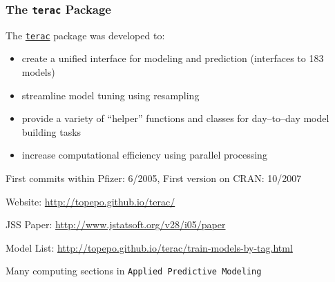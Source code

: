 \documentclass[12 pt]{beamer}\usepackage[]{graphicx}\usepackage[]{color}
\newcommand{\pkg}[1]{{\fontseries{b}\selectfont #1}}
\renewcommand{\pkg}[1]{{\color{darkgreen}\texttt{#1}}}
\begin{document}
  \begin{frame}[fragile]
\frametitle{The \pkg{terac} Package}

The \href{http://cran.r-project.org/web/packages/terac/index.html}{\pkg{terac}}  package was developed to:
  \begin{itemize}
\item create a unified interface for modeling and prediction
(interfaces to 183 models)
\item streamline model tuning using resampling
\item provide a variety of ``helper'' functions and classes for day--to--day model building tasks
\item increase computational efficiency using parallel processing
\end{itemize}

\vspace{.08in}

First commits within Pfizer: 6/2005, First version on CRAN: 10/2007

\vspace{.06in}

Website: \href{http://topepo.github.io/terac/}{http://topepo.github.io/terac/}

\vspace{.06in}

JSS Paper: \href{http://www.jstatsoft.org/v28/i05/paper}{http://www.jstatsoft.org/v28/i05/paper}

\vspace{.06in}

Model List: \href{http://topepo.github.io/terac/train-models-by-tag.html}{http://topepo.github.io/terac/train-models-by-tag.html}

\vspace{.06in}

Many computing sections in {\tt Applied Predictive Modeling}

\end{frame}



\end{document}
